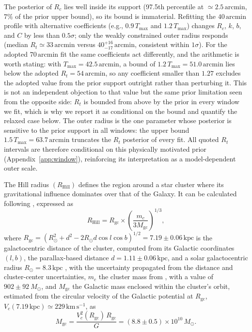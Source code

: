 \documentclass{aa}
\begin{document}
The posterior of $R_c$ lies well inside its support (97.5th percentile at $\simeq2.5\,\mathrm{arcmin}$, $7\%$ of the prior upper bound), so its bound is immaterial. Refitting the $40\,\mathrm{arcmin}$ profile with alternative coefficients (e.g., $0.9\,T_{\mathrm{max}}$ and $1.2\,T_{\mathrm{max}}$) changes $R_c$, $k$, $b$, and $C$ by less than $0.5\sigma$; only the weakly constrained outer radius responds (median $R_t\simeq33\,\mathrm{arcmin}$ versus $40^{+16}_{-17}\,\mathrm{arcmin}$, consistent within $1\sigma$). For the adopted $70\,\mathrm{arcmin}$ fit the same coefficients act differently, and the arithmetic is worth stating: with $T_{\mathrm{max}}=42.5\,\mathrm{arcmin}$, a bound of $1.2\,T_{\mathrm{max}}=51.0\,\mathrm{arcmin}$ lies below the adopted $R_t=54\,\mathrm{arcmin}$, so any coefficient smaller than $1.27$ excludes the adopted value from the prior support outright rather than perturbing it. This is not an independent objection to that value but the same prior limitation seen from the opposite side: $R_t$ is bounded from above by the prior in every window we fit, which is why we report it as conditional on the bound and quantify the relaxed case below. The outer radius is the one parameter whose posterior is sensitive to the prior support in all windows: the upper bound $1.5\,T_{\mathrm{max}}=63.7\,\mathrm{arcmin}$ truncates the $R_t$ posterior of every fit. All quoted $R_t$ intervals are therefore conditional on this physically motivated prior (Appendix~\ref{app:window}), reinforcing its interpretation as a model-dependent outer scale.

The Hill radius $(R_\mathrm{Hill})$ defines the region around a star cluster where its gravitational influence dominates over that of the Galaxy. It can be calculated following \citet{2019A&A...627A.119C}, expressed as
\begin{equation}
R_\mathrm{Hill} = R_{\mathrm{gc}} \times \left(\frac{m_c}{3M_{\mathrm{gc}}}\right)^{1/3},
\end{equation}
where $R_{\mathrm{gc}} = \left(R_\odot^{2} + d^{2} - 2 R_\odot d \cos l \cos b\right)^{1/2} = 7.19 \pm 0.06\,\mathrm{kpc}$ is the galactocentric distance of the cluster, computed from its Galactic coordinates $(l,b)$, the parallax-based distance $d = 1.11 \pm 0.06\,\mathrm{kpc}$, and a solar galactocentric radius $R_\odot = 8.3\,\mathrm{kpc}$ \citep{2016ApJS..227....5D}, with the uncertainty propagated from the distance and cluster-center uncertainties, $ m_c $ the cluster mass from \citet{2024arXiv240305143H}, with a value of $902 \pm 92~M_\odot$, and $ M_{\mathrm{gc}} $ the Galactic mass enclosed within the cluster's orbit, estimated from the circular velocity of the \citet{2017MNRAS.465...76M} Galactic potential at $R_{\mathrm{gc}}$, $V_c(7.19\,\mathrm{kpc}) \simeq 229\,\mathrm{km\,s^{-1}}$, as
\begin{equation}
	M_{\mathrm{gc}} = \frac{V_c^2(R_{\mathrm{gc}})\, R_{\mathrm{gc}}}{G} = (8.8 \pm 0.5) \times 10^{10}\,M_\odot.
\end{equation}
\end{document}

